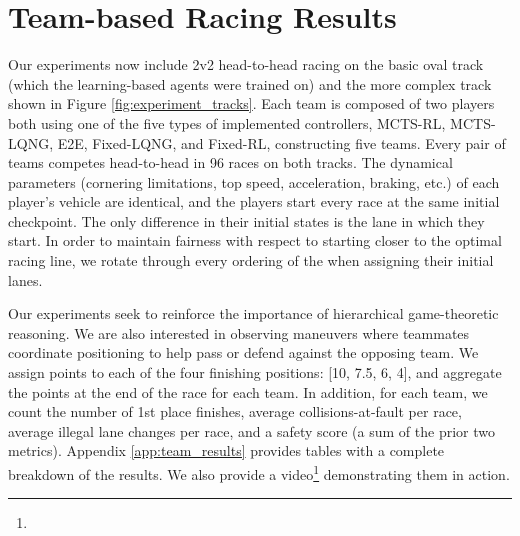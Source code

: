 \section{Team-based Racing Results}
Our experiments now include 2v2 head-to-head racing on the basic oval track (which the learning-based agents were trained on) and the more complex track shown in Figure \ref{fig:experiment_tracks}. Each team is composed of two players both using one of the five types of implemented controllers, MCTS-RL, MCTS-LQNG, E2E, Fixed-LQNG, and Fixed-RL, constructing five teams. Every pair of teams competes head-to-head in 96 races on both tracks. The dynamical parameters (cornering limitations, top speed, acceleration, braking, etc.) of each player's vehicle are identical, and the players start every race at the same initial checkpoint. The only difference in their initial states is the lane in which they start. In order to maintain fairness with respect to starting closer to the optimal racing line, we rotate through every ordering of the when assigning their initial lanes.

Our experiments seek to reinforce the importance of hierarchical game-theoretic reasoning. We are also interested in observing maneuvers where teammates coordinate positioning to help pass or defend against the opposing team. We assign points to each of the four finishing positions: [10, 7.5, 6, 4], and aggregate the points at the end of the race for each team. In addition, for each team, we count the number of 1st place finishes, average collisions-at-fault per race, average illegal lane changes per race, and a safety score (a sum of the prior two metrics). Appendix \ref{app:team_results} provides tables with a complete breakdown of the results. We also provide a video\footnote{\vidurlteam} demonstrating them in action. 



